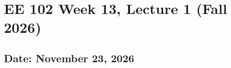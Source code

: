\documentclass{ee102_notes}
\renewcommand{\releasedate}{November 23, 2026}
\begin{document}
\section*{EE 102 Week 13, Lecture 1 (Fall 2026)}
\subsection*{Date: \releasedate}
\tableofcontents

\end{document}
